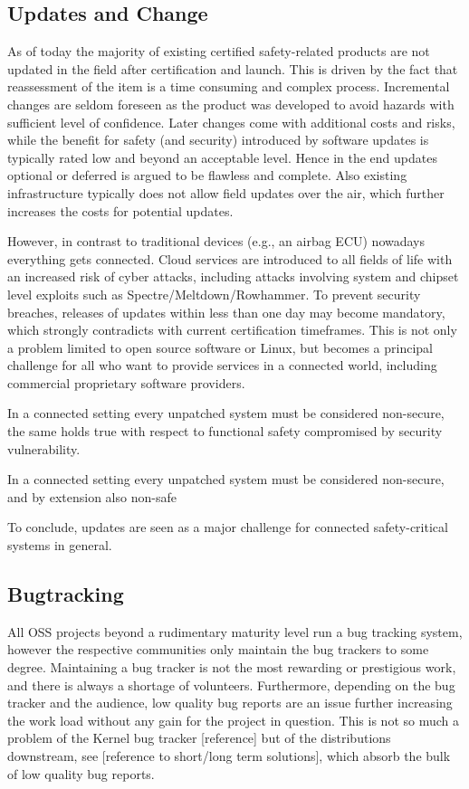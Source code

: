 \documentclass[12pt]{ElisaPaper}
\begin{document}
\subsection{Updates and Change}
\label{ssec:Updates and Change}
As of today the majority of existing certified safety-related products are not updated in the field after certification and launch.
This is driven by the fact that reassessment of the item is a time consuming and complex process.
Incremental changes are seldom foreseen as the product was developed to avoid hazards with sufficient level of confidence.
Later changes come with additional costs and risks, while the benefit for safety (and security) introduced by software updates is typically rated low and beyond an acceptable level.
Hence in the end updates optional or deferred is argued to be flawless and complete.
Also existing infrastructure typically does not allow field updates over the air, which further increases the costs for potential updates. 

However, in contrast to traditional devices (e.g., an airbag ECU) nowadays everything gets connected.
Cloud services are introduced to all fields of life with an increased risk of cyber attacks, including attacks involving system and chipset level exploits such as  Spectre/Meltdown/Rowhammer. 
To prevent security breaches, releases of updates within less than one day may become mandatory, which strongly contradicts with current certification timeframes.
This is not only a problem limited to open source software or Linux, but becomes a principal challenge for all who want to provide services in a connected world, including commercial proprietary software providers.

In a connected setting every unpatched system must be considered non-secure, the same holds true with respect to functional safety compromised by security vulnerability.

In a connected setting every unpatched system must be considered non-secure, and by extension also non-safe

To conclude, updates are seen as a major challenge for connected safety-critical systems in general.


\subsection{Bugtracking}
All OSS projects beyond a rudimentary maturity level run a bug tracking system, however the respective communities only maintain the bug trackers to some degree.
Maintaining a bug tracker is not the most rewarding or prestigious work, and there is always a shortage of volunteers.
Furthermore, depending on the bug tracker and the audience, low quality bug reports are an issue further increasing the work load without any gain for the project in question.
This is not so much a problem of the Kernel bug tracker [reference] but of the distributions downstream, see [reference to short/long term solutions], which absorb the bulk of low quality bug reports.
\end{document}
